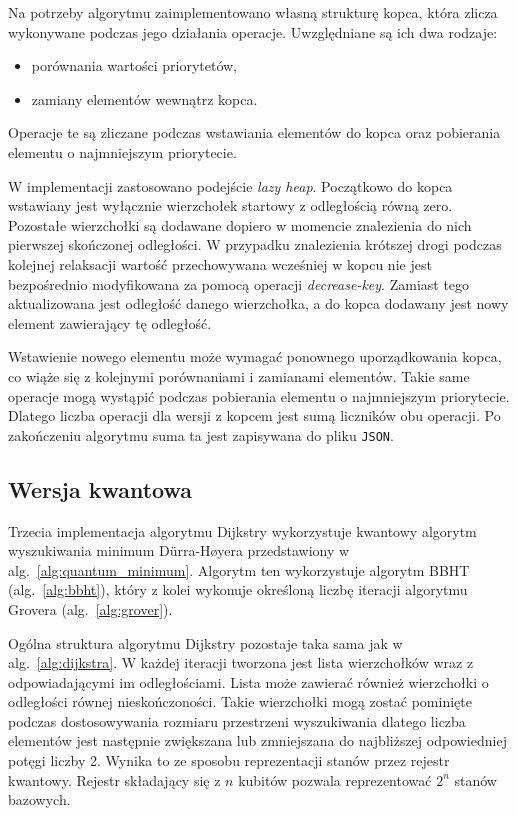 Na potrzeby algorytmu zaimplementowano własną strukturę kopca, która zlicza wykonywane podczas jego działania operacje. Uwzględniane są ich dwa rodzaje:
\begin{itemize}
\item porównania wartości priorytetów,
\item zamiany elementów wewnątrz kopca.
\end{itemize}
\noindent
Operacje te są zliczane podczas wstawiania elementów do kopca oraz pobierania elementu o najmniejszym priorytecie. 

W implementacji zastosowano podejście \textit{lazy heap}. Początkowo do kopca wstawiany jest wyłącznie wierzchołek startowy z odległością równą zero. Pozostałe wierzchołki są dodawane dopiero w momencie znalezienia do nich pierwszej skończonej odległości. W przypadku znalezienia krótszej drogi podczas kolejnej relaksacji wartość przechowywana wcześniej w kopcu nie jest bezpośrednio modyfikowana za pomocą operacji \textit{decrease-key}. Zamiast tego aktualizowana jest odległość danego wierzchołka, a do kopca dodawany jest nowy element zawierający tę odległość.

Wstawienie nowego elementu może wymagać ponownego uporządkowania kopca, co wiąże się z kolejnymi porównaniami i zamianami elementów. Takie same operacje mogą wystąpić podczas pobierania elementu o najmniejszym priorytecie. Dlatego liczba operacji dla wersji z kopcem jest sumą liczników obu operacji. Po zakończeniu algorytmu suma ta jest zapisywana do pliku \texttt{JSON}.
\newpage

\subsection{Wersja kwantowa}
\label{subsec:quantum_implementation}

Trzecia implementacja algorytmu Dijkstry wykorzystuje kwantowy algorytm wyszukiwania minimum Dürra-Høyera przedstawiony w alg.~\ref{alg:quantum_minimum}. Algorytm ten wykorzystuje algorytm BBHT (alg.~\ref{alg:bbht}), który z kolei wykonuje określoną liczbę iteracji algorytmu Grovera (alg.~\ref{alg:grover}).

Ogólna struktura algorytmu Dijkstry pozostaje taka sama jak w alg.~\ref{alg:dijkstra}. W każdej iteracji tworzona jest lista wierzchołków wraz z odpowiadającymi im odległościami. Lista może zawierać również wierzchołki o odległości równej nieskończoności. Takie wierzchołki mogą zostać pominięte podczas dostosowywania rozmiaru przestrzeni wyszukiwania dlatego liczba elementów jest następnie zwiększana lub zmniejszana do najbliższej odpowiedniej potęgi liczby 2. Wynika to ze sposobu reprezentacji stanów przez rejestr kwantowy. Rejestr składający się z $n$ kubitów pozwala reprezentować $2^n$ stanów bazowych. 

